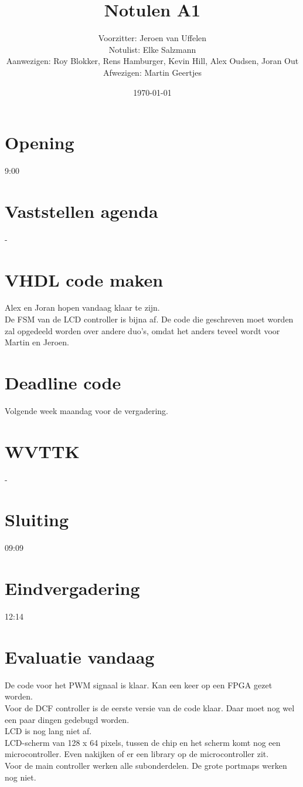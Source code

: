\documentclass[11pt,twoside,a4paper]{article}
\title{Notulen A1}
\author{
Voorzitter: Jeroen van Uffelen\\
Notulist: Elke Salzmann\\
Aanwezigen: Roy Blokker, Rens Hamburger, Kevin Hill, Alex Oudsen, Joran Out\\
Afwezigen: Martin Geertjes\\
}
\date{\today}
\begin{document}
\maketitle

\section{Opening}
9:00

\section{Vaststellen agenda}
-

\section{VHDL code maken}
Alex en Joran hopen vandaag klaar te zijn.\\
De FSM van de LCD controller is bijna af. De code die geschreven moet worden zal opgedeeld worden over andere duo's, omdat het anders teveel wordt voor Martin en Jeroen.

\section{Deadline code}
Volgende week maandag voor de vergadering.

\section{WVTTK}
-

\section{Sluiting}
09:09

\section{Eindvergadering}
12:14

\section{Evaluatie vandaag}
De code voor het PWM signaal is klaar. Kan een keer op een FPGA gezet worden.\\
Voor de DCF controller is de eerste versie van de code klaar. Daar moet nog wel een paar dingen gedebugd worden.\\
LCD is nog lang niet af.\\
LCD-scherm van 128 x 64 pixels, tussen de chip en het scherm komt nog een microcontroller. Even nakijken of er een library op de microcontroller zit.\\
Voor de main controller werken alle subonderdelen. De grote portmaps werken nog niet.
\end{document}
